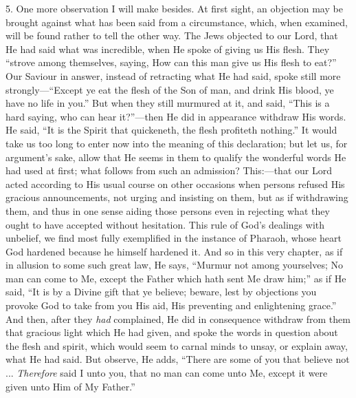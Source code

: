 5. One more observation I will make besides. At first sight, an
objection may be brought against what has been said from a
circumstance, which, when examined, will be found rather to tell the
other way. The Jews objected to our Lord, that He had said what was
incredible, when He spoke of giving us His flesh. They ``strove
among themselves, saying, How can this man give us His flesh to
eat?'' Our Saviour in answer, instead of retracting what He had
said, spoke still more strongly—``Except ye eat the flesh of the
Son of man, and drink His blood, ye have no life in you.'' But
when they still murmured at it, and said, ``This is a hard saying,
who can hear it?''—then He did in appearance withdraw His words.
He said, ``It is the Spirit that quickeneth, the flesh profiteth
nothing.'' It would take us too long to enter now into the meaning
of this declaration; but let us, for argument's sake, allow that He
seems in them to qualify the wonderful words He had used at first;
what follows from such an admission? This:—that our Lord acted
according to His usual course on other occasions when persons refused
His gracious announcements, not urging and insisting on them, but as
if withdrawing them, and thus in one sense aiding those persons even
in rejecting what they ought to have accepted without hesitation. This
rule of God's dealings with unbelief, we find most fully exemplified
in the instance of Pharaoh, whose heart God hardened because he
himself hardened it. And so in this very chapter, as if in allusion to
some such great law, He says, ``Murmur not among yourselves; No
man can come to Me, except the Father which hath sent Me draw
him;'' as if He said, ``It is by a Divine gift that ye
believe; beware, lest by objections you provoke God to take from you
His aid, His preventing and enlightening grace.'' And then, after
they \emph{had} complained, He did in consequence withdraw from them
that gracious light which He had given, and spoke the words in
question about the flesh and spirit, which would seem to carnal minds
to unsay, or explain away, what He had said. But observe, He adds,
``There are some of you that believe not ... \emph{Therefore} said
I unto you, that no man can come unto Me, except it were given unto
Him of My Father.''

